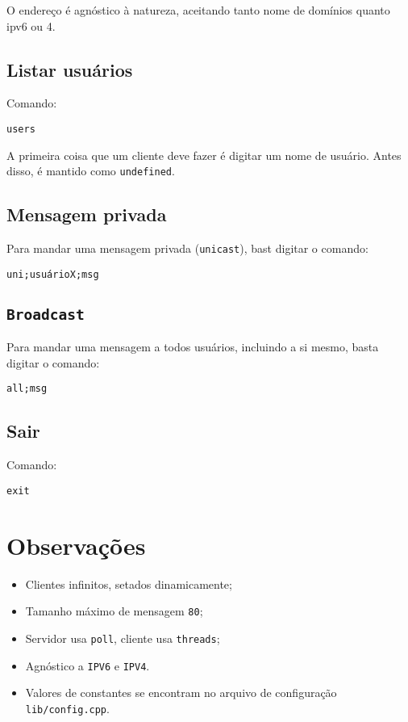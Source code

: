 \documentclass[11pt]{article}
\begin{document}
O endereço é agnóstico à natureza, aceitando tanto nome de domínios quanto ipv6 ou 4.
\subsection{Listar usuários}
\label{sec:orgaa27896}
Comando:
\begin{verbatim}
users
\end{verbatim}
A primeira coisa que um cliente deve fazer é digitar um nome de usuário. Antes disso,
é mantido como \texttt{undefined}.
\subsection{Mensagem privada}
\label{sec:org1d20abb}
Para mandar uma mensagem privada (\texttt{unicast}), bast digitar o comando:
\begin{verbatim}
uni;usuárioX;msg
\end{verbatim}
\subsection{\texttt{Broadcast}}
\label{sec:org9484c26}
Para mandar uma mensagem a todos usuários, incluindo a si mesmo, basta digitar o
comando:
\begin{verbatim}
all;msg
\end{verbatim}
\subsection{Sair}
\label{sec:orge84c84e}
Comando:
\begin{verbatim}
exit
\end{verbatim}
\section{Observações}
\label{sec:orga2c0550}
\begin{itemize}
\item Clientes infinitos, setados dinamicamente;
\item Tamanho máximo de mensagem \texttt{80};
\item Servidor usa \texttt{poll}, cliente usa \texttt{threads};
\item Agnóstico a \texttt{IPV6} e \texttt{IPV4}.
\item Valores de constantes se encontram no arquivo de configuração \texttt{lib/config.cpp}.
\end{itemize}
\end{document}
